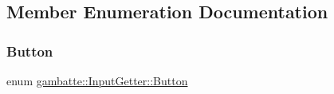 \subsection{Member Enumeration Documentation}
\mbox{\label{classgambatte_1_1InputGetter_a87fe4c12a05992f649a66a6a76f6fdf7}} 
\subsubsection{\texorpdfstring{Button}{Button}}
{\footnotesize\ttfamily enum \hyperlink{classgambatte_1_1InputGetter_a87fe4c12a05992f649a66a6a76f6fdf7}{gambatte\+::\+Input\+Getter\+::\+Button}}

